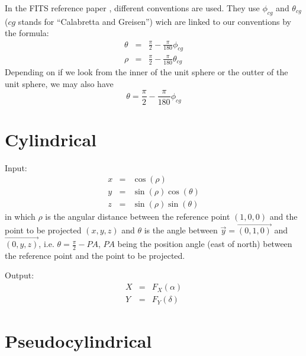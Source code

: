 \documentclass[a4paper,twoside,11pt]{article}
\begin{document}
  In the FITS reference paper \citep{Calabretta2002}, different conventions are used.
  They use $\phi_{cg}$ and $\theta_{cg}$ ($cg$ stands for ``Calabretta and Greisen'')
  wich are linked to our conventions by the formula:
  \begin{eqnarray}
    \theta & = & \frac{\pi}{2} - \frac{\pi}{180}\phi_{cg}   \label{eq:zen:theta} \\
    \rho   & = & \frac{\pi}{2} - \frac{\pi}{180}\theta_{cg} \label{eq:zen:rho}
  \end{eqnarray}
  Depending on if we look from the inner of the unit sphere or the outter of the unit sphere,
  we may also have
  \begin{equation}
    \theta = \frac{\pi}{2} - \frac{\pi}{180}\phi_{cg}   \label{eq:zen:theta_v2}
  \end{equation}


  
  
  
  
  
   
  
  
  
  

\section{Cylindrical}

  Input:
  \begin{eqnarray}
    x & = & \cos(\rho) \label{eq:zen.x} \\
    y & = & \sin(\rho) \cos(\theta) \label{eq:zen.y} \\
    z & = & \sin(\rho) \sin(\theta) \label{eq:zen.z}
  \end{eqnarray}
  in which $\rho$ is the angular distance between the reference point $(1, 0, 0)$
  and the point to be projected $(x, y, z)$ and $\theta$ is the angle between
  $\vec{y} = \vec{(0, 1, 0)}$ and $\vec{(0, y, z)}$, i.e. $\theta=\frac{\pi}{2} - PA$, $PA$
  being the position angle (east of north) between the reference point and the point
  to be projected.

  Output:
  \begin{eqnarray}
    X & = & F_X(\alpha) \label{eq:cylindrical.X} \\
    Y & = & F_Y(\delta) \label{eq:cylindrical.Y}
  \end{eqnarray}


  
  
  



\section{Pseudocylindrical}

  

  
\end{document}

